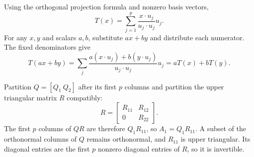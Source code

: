 Using the orthogonal projection formula and nonzero basis vectors,
\[
T(x)=\sum_{j=1}^p\frac{x\cdot u_j}{u_j\cdot u_j}u_j.
\]
For any $x,y$ and scalars $a,b$, substitute $ax+by$ and distribute
each numerator. The fixed denominators give
\[
T(ax+by)=\sum_j\frac{a(x\cdot u_j)+b(y\cdot u_j)}{u_j\cdot u_j}u_j
=aT(x)+bT(y).
\]

Partition $Q=[Q_1\ Q_2]$ after its first $p$ columns and partition
the upper triangular matrix $R$ compatibly:
\[
R=\begin{bmatrix}R_{11}&R_{12}\\0&R_{22}\end{bmatrix}.
\]
The first $p$ columns of $QR$ are therefore $Q_1R_{11}$, so
$A_1=Q_1R_{11}$. A subset of the orthonormal columns of $Q$ remains
orthonormal, and $R_{11}$ is upper triangular. Its diagonal entries
are the first $p$ nonzero diagonal entries of $R$, so it is invertible.

